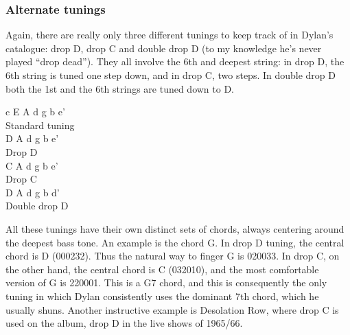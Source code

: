 \begin{articlelayout}
\subsubsection*{Alternate tunings}

Again, there are really only three different tunings to keep track of
in Dylan's catalogue: drop D, drop C and double drop D (to my
knowledge he's never played ``{}drop dead''{}). They all involve the
6th and deepest string: in drop D, the 6th string is tuned one step
down, and in drop C, two steps. In double drop D both the 1st and the
6th strings are tuned down to D.

\vspace{\baselineskip}
\begin{ctabular}{c}
\Large E A d g b e' \\
Standard tuning \vspace{2ex} \\
\Large D A d g b e' \\
Drop D \vspace{2ex} \\
\Large C A d g b e' \\
Drop C \vspace{2ex} \\
\Large D A d g b d'\\
Double drop D
\end{ctabular}

\noindent All these tunings have their own distinct sets of chords, always
centering around the deepest bass tone. An example is the chord G. In
drop D tuning, the central chord is D (000232). Thus the natural way
to finger G is 020033. In drop C, on the other hand, the central chord
is C (032010), and the most comfortable version of G is 220001. This
is a G7 chord, and this is consequently the only tuning in which Dylan
consistently uses the dominant 7th chord, which he usually
shuns. Another instructive example is Desolation Row, where drop C is
used on the album, drop D in the live shows of 1965/66.


\end{articlelayout}
